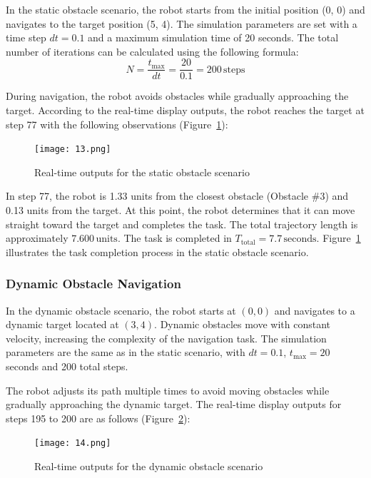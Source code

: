 In the static obstacle scenario, the robot starts from the initial position (0, 0) and navigates to the target position (5, 4). The simulation parameters are set with a time step \(dt = 0.1\) and a maximum simulation time of 20 seconds. The total number of iterations can be calculated using the following formula:
\[
N = \frac{t_{\text{max}}}{dt} = \frac{20}{0.1} = 200 \, \text{steps}
\]

During navigation, the robot avoids obstacles while gradually approaching the target. According to the real-time display outputs, the robot reaches the target at step 77 with the following observations (Figure~\ref{fig:static_output}):

\begin{figure}[ht]
    \centering
    \texttt{[image: 13.png]}
    \caption{Real-time outputs for the static obstacle scenario}
    \label{fig:static_output}
\end{figure}

In step 77, the robot is 1.33 units from the closest obstacle (Obstacle \#3) and 0.13 units from the target. At this point, the robot determines that it can move straight toward the target and completes the task. The total trajectory length is approximately \(7.600 \, \text{units}\). The task is completed in \(T_{\text{total}} = 7.7 \, \text{seconds}\). Figure~\ref{fig:static_output} illustrates the task completion process in the static obstacle scenario.


\subsubsection{Dynamic Obstacle Navigation}

In the dynamic obstacle scenario, the robot starts at \((0, 0)\) and navigates to a dynamic target located at \((3, 4)\). Dynamic obstacles move with constant velocity, increasing the complexity of the navigation task. The simulation parameters are the same as in the static scenario, with \(dt = 0.1\), \(t_{\text{max}} = 20\) seconds and 200 total steps.

The robot adjusts its path multiple times to avoid moving obstacles while gradually approaching the dynamic target. The real-time display outputs for steps 195 to 200 are as follows (Figure~\ref{fig:dynamic_output}):

\begin{figure}[ht]
    \centering
    \texttt{[image: 14.png]}
    \caption{Real-time outputs for the dynamic obstacle scenario}
    \label{fig:dynamic_output}
\end{figure}

